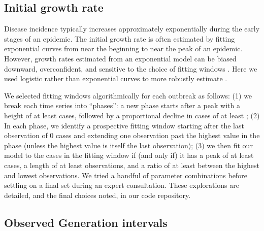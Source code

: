 \subsection*{Initial growth rate}

Disease incidence typically increases approximately exponentially during the early stages of an epidemic. The initial growth rate \littler is often estimated by fitting exponential curves from near the beginning to near the peak of an epidemic.
However, growth rates estimated from an exponential model can be biased downward, overconfident, and sensitive to the choice of fitting windows \citep{ma2014estimating}.
Here we used logistic rather than exponential curves to more robustly estimate \littler \citep{ma2014estimating, chowell2017fitting}.

We selected fitting windows algorithmically for each outbreak as follows: (1) we break each time series into “phases”: a new phase starts after a peak with a height of at least  cases, followed by a proportional decline in cases of at least ; (2) In each phase, we identify a prospective fitting window starting after the last observation of 0 cases and extending one observation past the highest value in the phase (unless the highest value is itself the last observation); (3) we then fit our model to the cases in the fitting window if (and only if) it has a peak of at least  cases, a length of at least  observations, and a ratio of at least  between the highest and lowest observations. We tried a handful of parameter combinations before settling on a final set during an expert consultation. These explorations are detailed, and the final choices noted, in our code repository.

\subsection*{Observed Generation intervals}

